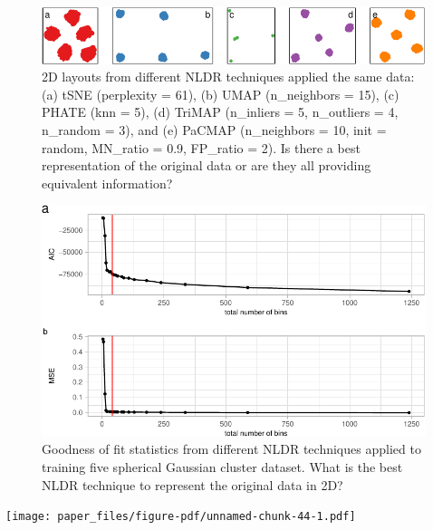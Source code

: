 \documentclass[
  12pt]{article}
\begin{document}
\begin{figure}

{\centering \includegraphics[width=1\textwidth,height=\textheight]{paper_files/figure-pdf/fig-nldervis5Gau-1.pdf}

}

\caption{\label{fig-nldervis5Gau}2D layouts from different NLDR
techniques applied the same data: (a) tSNE (perplexity = 61), (b) UMAP
(n\_neighbors = 15), (c) PHATE (knn = 5), (d) TriMAP (n\_inliers = 5,
n\_outliers = 4, n\_random = 3), and (e) PaCMAP (n\_neighbors = 10, init
= random, MN\_ratio = 0.9, FP\_ratio = 2). Is there a best
representation of the original data or are they all providing equivalent
information?}

\end{figure}

\begin{figure}

{\centering \includegraphics[width=1\textwidth,height=\textheight]{paper_files/figure-pdf/fig-diagnosticpltGau-1.pdf}

}

\caption{\label{fig-diagnosticpltGau}Goodness of fit statistics from
different NLDR techniques applied to training five spherical Gaussian
cluster dataset. What is the best NLDR technique to represent the
original data in 2D?}

\end{figure}

\texttt{[image: paper\_files/figure-pdf/unnamed-chunk-44-1.pdf]}
\end{document}
